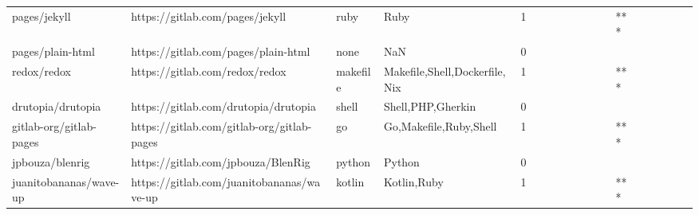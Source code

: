 \begin{tabular}{llllrlllllllllllll}
pages/jekyll                                       &                    https://gitlab.com/pages/jekyll &              ruby &                                               Ruby &       1 &         &        &           &                &                 &        &           &       *** &          &          &       &              &          \\
pages/plain-html                                   &                https://gitlab.com/pages/plain-html &              none &                                                NaN &       0 &         &        &           &                &                 &        &           &           &          &          &       &              &          \\
redox/redox                                        &                     https://gitlab.com/redox/redox &          makefile &                      Makefile,Shell,Dockerfile,Nix &       1 &         &        &           &                &                 &        &           &       *** &          &          &       &              &          \\
drutopia/drutopia                                  &               https://gitlab.com/drutopia/drutopia &             shell &                                  Shell,PHP,Gherkin &       0 &         &        &           &                &                 &        &           &           &          &          &       &              &          \\
gitlab-org/gitlab-pages                            &         https://gitlab.com/gitlab-org/gitlab-pages &                go &                             Go,Makefile,Ruby,Shell &       1 &         &        &           &                &                 &        &           &       *** &          &          &       &              &          \\
jpbouza/blenrig                                    &                 https://gitlab.com/jpbouza/BlenRig &            python &                                             Python &       0 &         &        &           &                &                 &        &           &           &          &          &       &              &          \\
juanitobananas/wave-up                             &          https://gitlab.com/juanitobananas/wave-up &            kotlin &                                        Kotlin,Ruby &       1 &         &        &           &                &                 &        &           &       *** &          &          &       &              &          \\

\end{tabular}
